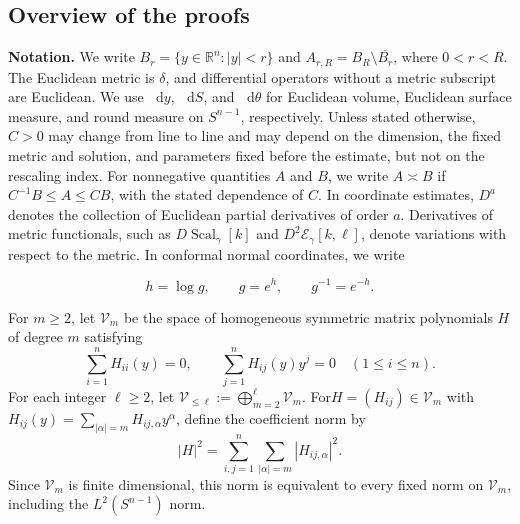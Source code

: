 \documentclass[11pt]{article}
\numberwithin{equation}{section}
\theoremstyle{remark}
\newcommand{\R}{\mathbb R}
\newcommand{\Sph}{S}
\newcommand{\dd}{\mathop{}\!\mathrm{d}}
\begin{document}
\subsection*{Overview of the proofs}

\medskip\noindent\textbf{Notation.}
We write \(B_r=\{y\in\R^n:|y|<r\}\) and
\(A_{r,R}=B_R\setminus\overline{B_r}\), where \(0<r<R\).
The Euclidean metric is \(\delta\), and differential operators without a
metric subscript are Euclidean. We use \(\dd y\), \(\dd S\), and
\(\dd\theta\) for Euclidean volume, Euclidean surface measure, and round
measure on \(\Sph^{n-1}\), respectively. Unless stated otherwise,
\(C>0\) may change from line to line and may depend on
the dimension, the fixed metric and solution, and parameters fixed before
the estimate, but not on the rescaling index. For nonnegative quantities
\(A\) and \(B\), we write \(A\asymp B\) if
\(C^{-1}B\le A\le CB\), with the stated dependence of \(C\).
In coordinate estimates, \(D^a\) denotes the collection of Euclidean
partial derivatives of order \(a\). Derivatives of metric functionals,
such as \(D\!\operatorname{Scal}_\gamma[k]\) and
\(D^2\mathcal E_\gamma[k,\ell]\), denote variations with respect to the
metric. In conformal normal coordinates, we write

\[
 h=\log g,\qquad g=e^h,\qquad g^{-1}=e^{-h}.
\]


 For \(m\ge2\), let \(\mathcal V_m\) be the space of homogeneous symmetric
matrix polynomials \(H\) of degree \(m\) satisfying
\begin{equation}\label{eq:jet-gauge}
 \sum_{i=1}^nH_{ii}(y)=0,\qquad
 \sum_{j=1}^nH_{ij}(y)y^j=0\quad(1\le i\le n).
\end{equation}
For each integer \(\ell\ge2\), let \(\mathcal V_{\le\ell}:=\bigoplus_{m=2}^{\ell}\mathcal V_m\).
For\(H=(H_{ij})\in\mathcal V_m\) with
\(H_{ij}(y)=\sum_{|\alpha|=m}H_{ij,\alpha}y^\alpha\), define the coefficient norm by
\begin{equation}\label{eq:coefficient-norm}
|H|^2=\sum_{i,j=1}^n\sum_{|\alpha|=m}|H_{ij,\alpha}|^2.
\end{equation}
Since \(\mathcal V_m\) is finite dimensional, this norm is equivalent to
every fixed norm on \(\mathcal V_m\), including the
\(L^2(\Sph^{n-1})\) norm.
\end{document}
